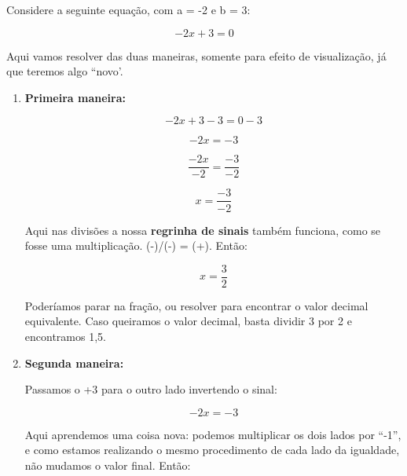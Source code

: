 \begin{exemplo}
    Considere a seguinte equação, com a = -2 e b = 3:

    \begin{equation}
        -2x+3=0
    \end{equation}

    Aqui vamos resolver das duas maneiras, somente para efeito de visualização, já que teremos algo ``novo'.

    \begin{enumerate}
        \item \textbf{Primeira maneira:}

        \begin{equation}
            -2x+3-3=0-3
        \end{equation}

        \begin{equation}
            -2x=-3
        \end{equation}

        \begin{equation}
            \frac{-2x}{-2}=\frac{-3}{-2}
        \end{equation}
        
        \begin{equation}
            x=\frac{-3}{-2}
        \end{equation}

        Aqui nas divisões a nossa \textbf{regrinha de sinais} também funciona, como se fosse uma multiplicação. (-)/(-) = (+). Então:

        \begin{equation}
            x=\frac{3}{2}
        \end{equation}

        Poderíamos parar na fração, ou resolver para encontrar o valor decimal equivalente. Caso queiramos o valor decimal, basta dividir 3 por 2 e encontramos 1,5.

        \item \textbf{Segunda maneira:}

        Passamos o +3 para o outro lado invertendo o sinal:
        
        \begin{equation}
            -2x=-3
        \end{equation}

        Aqui aprendemos uma coisa nova: podemos multiplicar os dois lados por ``-1'', e como estamos realizando o mesmo procedimento de cada lado da igualdade, não mudamos o valor final. Então:


\end{enumerate}
\end{exemplo}
